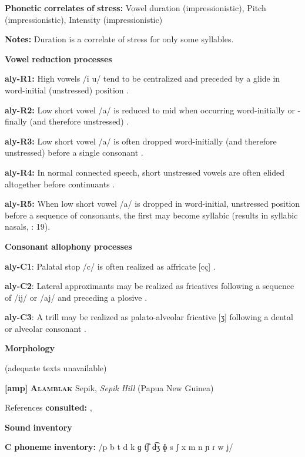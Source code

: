 \begin{styleBody}
\textbf{Phonetic} \textbf{correlates} \textbf{of} \textbf{stress:} Vowel duration (impressionistic), Pitch (impressionistic), Intensity (impressionistic)

\textbf{Notes:} Duration is a correlate of stress for only some syllables.

\textbf{Vowel} \textbf{reduction} \textbf{processes}

\textbf{aly-R1:} High vowels /i u/ tend to be centralized and preceded by a glide in word-initial (unstressed) position \citep[25]{Yallop1977}.

\textbf{aly-R2:} Low short vowel /a/ is reduced to mid when occurring word-initially or -finally (and therefore unstressed) \citep[25]{Yallop1977}.

\textbf{aly-R3:} Low short vowel /a/ is often dropped word-initially (and therefore unstressed) before a single consonant \citep[28]{Yallop1977}.

\textbf{aly-R4:} In normal connected speech, short unstressed vowels are often elided altogether before continuants \citep[27]{Yallop1977}.

\textbf{aly-R5:} When low short vowel /a/ is dropped in word-initial, unstressed position before a sequence of consonants, the first may become syllabic (results in syllabic nasals, \citealt{Yallop1977}: 19).

\textbf{Consonant} \textbf{allophony} \textbf{processes}

\textbf{aly-C1}: Palatal stop /c/ is often realized as affricate [cç] \citep[21]{Yallop1977}.

\textbf{aly-C2}: Lateral approximants may be realized as fricatives following a sequence of /ij/ or /aj/ and preceding a plosive \citep[19]{Yallop1977}.

\textbf{aly-C3}: A trill may be realized as palato-alveolar fricative [ʒ] following a dental or alveolar consonant \citep[19]{Yallop1977}.

\textbf{Morphology}

(adequate texts unavailable)

\textbf{[amp]}   \textbf{\textsc{Alamblak}}  Sepik, \textit{Sepik} \textit{Hill} (Papua New Guinea)

References \textbf{consulted:} \citet{Bruce1984}, \citet{EdmistonEdmiston2003}

\textbf{Sound} \textbf{inventory}

\textbf{C} \textbf{phoneme} \textbf{inventory:} /p b t d k ɡ t͡ʃ d͡ʒ ɸ s ʃ x m n ɲ ɾ w j/


\end{styleBody}
